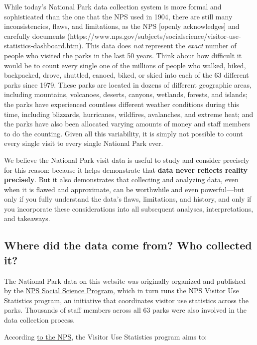 \documentclass[
  letterpaper,
  DIV=11,
  numbers=noendperiod]{scrartcl}
\begin{document}
While today's National Park data collection system is more formal and
sophisticated than the one that the NPS used in 1904, there are still
many inconsistencies, flaws, and limitations, as the NPS {[}openly
acknowledges{]} and carefully documents
(https://www.nps.gov/subjects/socialscience/visitor-use-statistics-dashboard.htm).
This data does \emph{not} represent the \emph{exact} number of people
who visited the parks in the last 50 years. Think about how difficult it
would be to count every single one of the millions of people who walked,
hiked, backpacked, drove, shuttled, canoed, biked, or skied into each of
the 63 different parks since 1979. These parks are located in dozens of
different geographic areas, including mountains, volcanoes, deserts,
canyons, wetlands, forests, and islands; the parks have experienced
countless different weather conditions during this time, including
blizzards, hurricanes, wildfires, avalanches, and extreme heat; and the
parks have also been allocated varying amounts of money and staff
members to do the counting. Given all this variability, it is simply not
possible to count every single visit to every single National Park ever.

We believe the National Park visit data is useful to study and consider
precisely for this reason: because it helps demonstrate that
\textbf{data never reflects reality precisely}. But it also demonstrates
that collecting and analyzing data, even when it is flawed and
approximate, can be worthwhile and even powerful---but only if you fully
understand the data's flaws, limitations, and history, and only if you
incorporate these considerations into all subsequent analyses,
interpretations, and takeaways.

\subsection{Where did the data come from? Who collected
it?}\label{where-did-the-data-come-from-who-collected-it}

The National Park data on this website was originally organized and
published by the
\href{https://www.nps.gov/subjects/socialscience/visitor-use-statistics.htm}{NPS
Social Science Program}, which in turn runs the NPS Visitor Use
Statistics program, an initiative that coordinates visitor use
statistics across the parks. Thousands of staff members across all 63
parks were also involved in the data collection process.

According
\href{https://www.nps.gov/subjects/socialscience/statistics-history.htm}{to
the NPS}, the Visitor Use Statistics program aims to:
\end{document}
